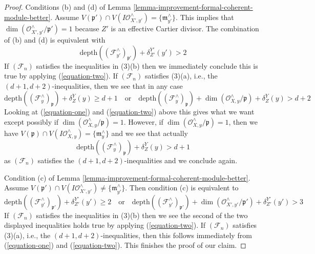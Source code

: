 \begin{proof}
\medskip\noindent
Conditions (b) and (d) of
Lemma \ref{lemma-improvement-formal-coherent-module-better}. Assume
$V(\mathfrak p') \cap V(I\mathcal{O}_{X', y'}^\wedge) =
\{\mathfrak m_{y'}^\wedge\}$.
This implies that $\dim(\mathcal{O}_{X', y'}^\wedge/\mathfrak p') = 1$
because $Z'$ is an effective Cartier divisor.
The combination of (b) and (d) is equivalent with
$$
\text{depth}((\mathcal{F}_{y'}^\wedge)_{\mathfrak p'}) + \delta^{Y'}_{Z'}(y')
> 2
$$
If $(\mathcal{F}_n)$ satisfies the inequalities in (3)(b)
then we immediately conclude this is true by applying (\ref{equation-two}).
If $(\mathcal{F}_n)$ satisfies (3)(a), i.e., the
$(d + 1, d + 2)$-inequalities, then we see that in any case
$$
\text{depth}((\mathcal{F}_y^\wedge)_{\mathfrak p}) + \delta^Y_Z(y)
\geq d + 1
\quad\text{or}\quad
\text{depth}((\mathcal{F}_y^\wedge)_{\mathfrak p}) +
\dim(\mathcal{O}_{X, y}^\wedge/\mathfrak p) +
\delta^Y_Z(y) > d + 2
$$
Looking at (\ref{equation-one}) and (\ref{equation-two}) above this gives
what we want except possibly if
$\dim(\mathcal{O}_{X, y}^\wedge/\mathfrak p) = 1$.
However, if $\dim(\mathcal{O}_{X, y}^\wedge/\mathfrak p) = 1$, then we have
$V(\mathfrak p) \cap V(I\mathcal{O}_{X, y}^\wedge) = \{\mathfrak m_y^\wedge\}$
and we see that actually
$$
\text{depth}((\mathcal{F}_y^\wedge)_{\mathfrak p}) + \delta^Y_Z(y) > d + 1
$$
as $(\mathcal{F}_n)$ satisfies the $(d + 1, d + 2)$-inequalities and we
conclude again.

\medskip\noindent
Condition (c) of
Lemma \ref{lemma-improvement-formal-coherent-module-better}. Assume
$V(\mathfrak p') \cap V(I\mathcal{O}_{X', y'}^\wedge) \not =
\{\mathfrak m_{y'}^\wedge\}$. Then condition (c) is equivalent to
$$
\text{depth}((\mathcal{F}_{y'}^\wedge)_{\mathfrak p'}) + \delta^{Y'}_{Z'}(y')
\geq 2
\quad\text{or}\quad
\text{depth}((\mathcal{F}_{y'}^\wedge)_{\mathfrak p'}) +
\dim(\mathcal{O}_{X', y'}^\wedge/\mathfrak p') +
\delta^{Y'}_{Z'}(y') > 3
$$
If $(\mathcal{F}_n)$ satisfies the inequalities in (3)(b)
then we see the second of the two displayed inequalities holds true
by applying (\ref{equation-two}). If $(\mathcal{F}_n)$ satisfies (3)(a), i.e.,
the $(d + 1, d + 2)$-inequalities, then this follows immediately from
(\ref{equation-one}) and (\ref{equation-two}).
This finishes the proof of our claim.


\end{proof}
